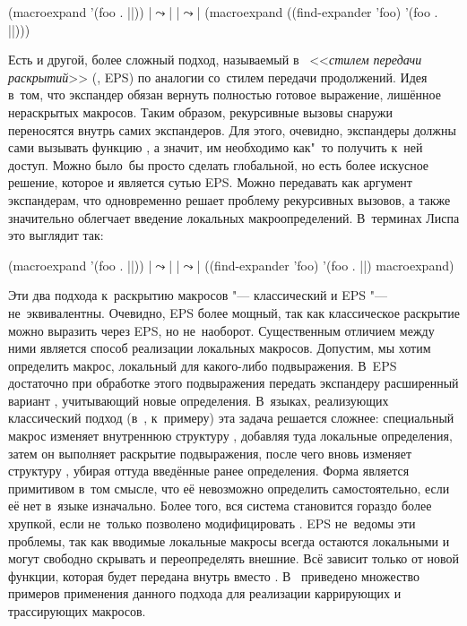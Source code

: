 \begin{code:lisp}
(macroexpand '(foo . ||)) |$\leadsto$|
   |$\leadsto$| (macroexpand ((find-expander 'foo) '(foo . ||)))
\end{code:lisp}

Есть и другой, более сложный подход, называемый в~\cite{dfh88} <<\emph{стилем
передачи раскрытий}>> (, EPS) по аналогии
со~стилем передачи продолжений. Идея в~том, что экспандер обязан вернуть
полностью готовое выражение, лишённое нераскрытых макросов. Таким образом,
рекурсивные вызовы  снаружи переносятся внутрь самих
экспандеров. Для этого, очевидно, экспандеры должны сами вызывать функцию
, а значит, им необходимо как"~то получить к~ней доступ. Можно
было~бы просто сделать  глобальной, но есть более искусное
решение, которое и является сутью EPS. Можно передавать  как
аргумент экспандерам, что одновременно решает проблему рекурсивных вызовов, а
также значительно облегчает введение локальных макроопределений. В~терминах
Лиспа это выглядит так:

\begin{code:lisp}
(macroexpand '(foo . ||)) |$\leadsto$|
   |$\leadsto$| ((find-expander 'foo) '(foo . ||) macroexpand)
\end{code:lisp}

Эти два подхода к~раскрытию макросов "--- классический и EPS "---
не~эквивалентны. Очевидно, EPS более мощный, так как классическое раскрытие
можно выразить через EPS, но не~наоборот. Существенным отличием между
ними является способ реализации локальных макросов. Допустим, мы хотим
определить макрос, локальный для какого-либо подвыражения. В~EPS достаточно при
обработке этого подвыражения передать экспандеру расширенный вариант
, учитывающий новые определения. В~языках, реализующих
классический подход (в~{\CommonLisp}, к~примеру) эта задача решается сложнее:
специальный макрос  изменяет внутреннюю структуру ,
добавляя туда локальные определения, затем он выполняет раскрытие подвыражения,
после чего вновь изменяет структуру , убирая оттуда введённые
ранее определения. Форма  является примитивом в~том смысле, что её
невозможно определить самостоятельно, если её нет в~языке изначально. Более
того, вся система становится гораздо более хрупкой, если не~только 
позволено модифицировать . EPS не~ведомы эти проблемы, так как
вводимые локальные макросы всегда остаются локальными и могут свободно скрывать
и переопределять внешние. Всё зависит только от новой функции, которая будет
передана внутрь вместо . В~\cite{dfh88} приведено множество
примеров применения данного подхода для реализации каррирующих и трассирующих
макросов.

